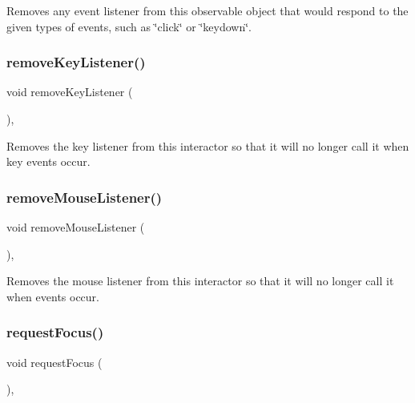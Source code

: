 Removes any event listener from this observable object that would respond to the given types of events, such as \char`\"{}click\char`\"{} or \char`\"{}keydown\char`\"{}. 

\mbox{\label{classGInteractor_a43095f41cab3be732b49f29970484b05}} 
\subsubsection{\texorpdfstring{remove\+Key\+Listener()}{removeKeyListener()}}
{\footnotesize\ttfamily void remove\+Key\+Listener (\begin{DoxyParamCaption}{ }\end{DoxyParamCaption})\hspace{0.3cm}{\ttfamily [virtual]}, {\ttfamily [inherited]}}



Removes the key listener from this interactor so that it will no longer call it when key events occur. 

\mbox{\label{classGInteractor_aff47f71ce47e688a07c9d38dc92fcc11}} 
\subsubsection{\texorpdfstring{remove\+Mouse\+Listener()}{removeMouseListener()}}
{\footnotesize\ttfamily void remove\+Mouse\+Listener (\begin{DoxyParamCaption}{ }\end{DoxyParamCaption})\hspace{0.3cm}{\ttfamily [virtual]}, {\ttfamily [inherited]}}



Removes the mouse listener from this interactor so that it will no longer call it when events occur. 

\mbox{\label{classGInteractor_a519fb2ac767f8b2febbb50b898b8c8cb}} 
\subsubsection{\texorpdfstring{request\+Focus()}{requestFocus()}}
{\footnotesize\ttfamily void request\+Focus (\begin{DoxyParamCaption}{ }\end{DoxyParamCaption})\hspace{0.3cm}{\ttfamily [virtual]}, {\ttfamily [inherited]}}



